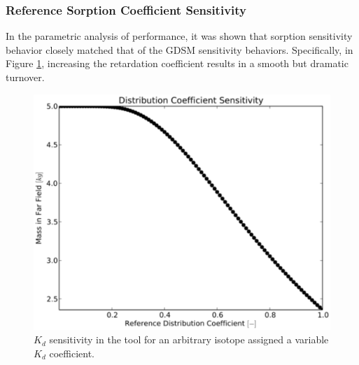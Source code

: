 
\subsubsection{Reference Sorption Coefficient Sensitivity}

In the parametric analysis of \Cyder performance, it was shown that sorption 
sensitivity behavior closely matched that of the \gls{GDSM} sensitivity 
behaviors. Specifically, in Figure \ref{fig:kd_result}, increasing the retardation 
coefficient results in a smooth but dramatic turnover. 

\begin{figure}[ht]
\centering
\includegraphics[width=0.7\linewidth]{./chapters/demonstration/bench/kd.eps}
\caption[$K_d$ sensitivity in the Mixed Cell Model]{$K_d$ sensitivity in the 
\Cyder tool for an arbitrary isotope assigned a variable $K_d$ coefficient.} 
\label{fig:kd_result}
\end{figure}
